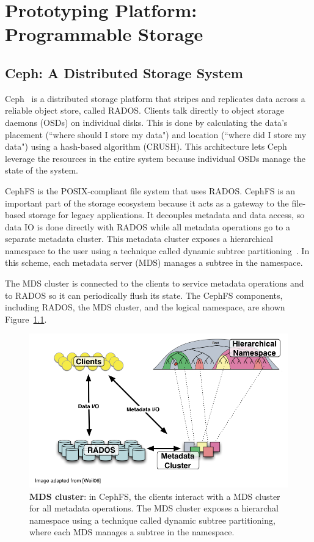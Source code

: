 \chapter{Prototyping Platform: Programmable Storage}
\label{chp:prototyping-platform}

\section{Ceph: A Distributed Storage System }
Ceph~\cite{weil:osdi2006-ceph} is a distributed storage platform that stripes
and replicates data across a reliable object store, called RADOS. Clients talk
directly to object storage daemons (OSDs) on individual disks. This is done by
calculating the data's placement (``where should I store my data") and location
(``where did I store my data") using a hash-based algorithm (CRUSH). This
architecture lets Ceph leverage the resources in the entire system because
individual OSDs manage the state of the system. 

CephFS is the POSIX-compliant file system that uses RADOS. CephFS is an
important part of the storage ecosystem because it acts as a gateway to the
file-based storage for legacy applications. It decouples metadata and data
access, so data IO is done directly with RADOS while all metadata operations go
to a separate metadata cluster. This metadata cluster exposes a hierarchical
namespace to the user using a technique called dynamic subtree
partitioning~\cite{weil:sc2004-dyn-metadata}. In this scheme, each metadata
server (MDS) manages a subtree in the namespace. 

The MDS cluster is connected to the clients to service metadata operations and
to RADOS so it can periodically flush its state. The CephFS components,
including RADOS, the MDS cluster, and the logical namespace, are shown
Figure~\ref{ceph-arch}. 

\begin{figure}[tbh]
\centering
	\includegraphics[width=1\textwidth]{./chapters/advancement/figures/ceph-arch.png} 

	\caption{\textbf{MDS cluster}: in CephFS, the clients interact with a
        MDS cluster for all metadata operations. The MDS cluster exposes a hierarchal
        namespace using a technique called dynamic subtree partitioning, where each MDS
        manages a subtree in the namespace.\label{ceph-arch}}

\end{figure}

